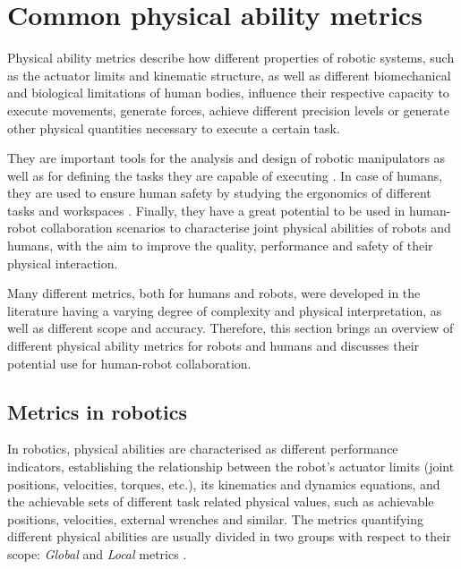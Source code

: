 \section{Common physical ability metrics}

Physical ability metrics describe how different properties of robotic systems, such as the actuator limits and kinematic structure, as well as different biomechanical and biological limitations of human bodies, influence their respective capacity to execute movements, generate forces, achieve different precision levels or generate other physical quantities necessary to execute a certain task.

They are important tools for the analysis and design of robotic manipulators\cite{patel2015manipulator} as well as for defining the tasks they are capable of executing \cite{Pholsiri2015task}. In case of humans, they are used to ensure human safety by studying the ergonomics of different tasks and workspaces \cite{Golabchi2015}. Finally, they have a great potential to be used in human-robot collaboration scenarios to characterise joint physical abilities of robots and humans, with the aim to improve the quality, performance and safety of their physical interaction.

Many different metrics, both for humans and robots, were developed in the literature having a varying degree of complexity and physical interpretation, as well as different scope and accuracy.
Therefore, this section brings an overview of different physical ability metrics for robots and humans and discusses their potential use for human-robot collaboration.

\subsection{Metrics in robotics}
In robotics, physical abilities are characterised as different performance indicators, establishing the relationship between the robot's actuator limits (joint positions, velocities, torques, etc.), its kinematics and dynamics equations, and the achievable sets of different task related physical values, such as achievable positions, velocities, external wrenches and similar. The metrics quantifying different physical abilities are usually divided in two groups with respect to their scope: \textit{Global} and \textit{Local} metrics  \cite{russo2022measuring}. 

